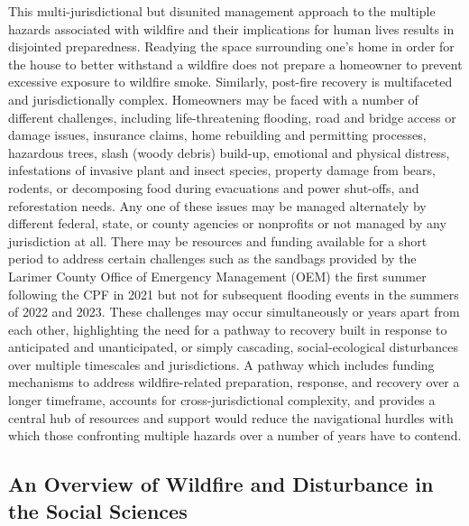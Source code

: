 \documentclass[
]{article}
\begin{document}
This multi-jurisdictional but disunited management approach to the multiple hazards associated with wildfire and their implications for human lives results in disjointed preparedness. Readying the space surrounding one's home in order for the house to better withstand a wildfire does not prepare a homeowner to prevent excessive exposure to wildfire smoke. Similarly, post-fire recovery is multifaceted and jurisdictionally complex. Homeowners may be faced with a number of different challenges, including life-threatening flooding, road and bridge access or damage issues, insurance claims, home rebuilding and permitting processes, hazardous trees, slash (woody debris) build-up, emotional and physical distress, infestations of invasive plant and insect species, property damage from bears, rodents, or decomposing food during evacuations and power shut-offs, and reforestation needs. Any one of these issues may be managed alternately by different federal, state, or county agencies or nonprofits or not managed by any jurisdiction at all. There may be resources and funding available for a short period to address certain challenges such as the sandbags provided by the Larimer County Office of Emergency Management (OEM) the first summer following the CPF in 2021 but not for subsequent flooding events in the summers of 2022 and 2023. These challenges may occur simultaneously or years apart from each other, highlighting the need for a pathway to recovery built in response to anticipated and unanticipated, or simply cascading, social-ecological disturbances over multiple timescales and jurisdictions. A pathway which includes funding mechanisms to address wildfire-related preparation, response, and recovery over a longer timeframe, accounts for cross-jurisdictional complexity, and provides a central hub of resources and support would reduce the navigational hurdles with which those confronting multiple hazards over a number of years have to contend.

\subsection{An Overview of Wildfire and Disturbance in the Social Sciences}\label{an-overview-of-wildfire-and-disturbance-in-the-social-sciences}
\end{document}
